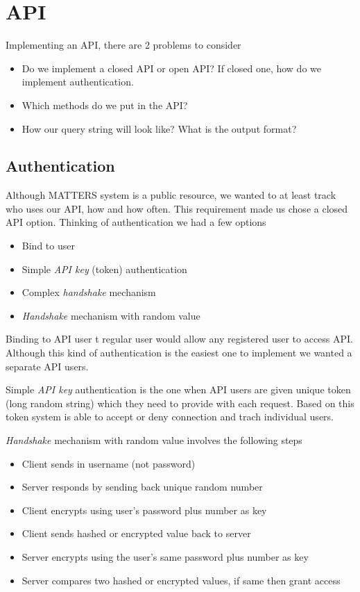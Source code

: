 \section{API}
		
		Implementing an API, there are 2 problems to consider
		\begin{itemize}
			\item
				Do we implement a closed API or open API? If closed one, how do we implement authentication.
			\item
				Which methods do we put in the API?
			\item
				How our query string will look like? What is the output format?
		\end{itemize}
		
		\subsection{Authentication}
			
			Although MATTERS system is a public resource, we wanted to at least track who uses our API, how and how often. This requirement made us chose a closed API option. Thinking of authentication we had a few options
			\begin{itemize}
				\item
					Bind to user
				\item
					Simple \emph{API key} (token) authentication
				\item
					Complex \emph{handshake} mechanism					
				\item
					\emph{Handshake} mechanism with random value
			\end{itemize}
			
			Binding to API user t regular user would allow any registered user to access API. Although this kind of authentication is the easiest one to implement we wanted a separate API users.
			
			Simple  \emph{API key} authentication is the one when API users are given unique token (long random string) which they need to provide with each request. Based on this token system is able to accept or deny connection and trach individual users.
			
			\emph{Handshake} mechanism with random value involves the following steps
			
			\begin{itemize}
				\item
					Client sends in username (not password)
				\item
					Server responds by sending back unique random number
				\item
					Client encrypts using user's password plus number as key
				\item
					Client sends hashed or encrypted value back to server
				\item
					Server encrypts using the user's same password plus number as key
				\item
					Server compares two hashed or encrypted values, if same then grant access
			\end{itemize}
			
